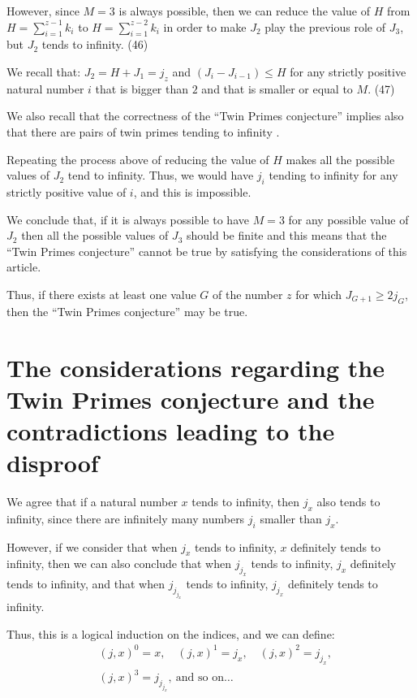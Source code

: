 \documentclass[11pt]{article}
\begin{document}
However, since $M=3$ is always possible, then we can reduce the value of $H$ from $H = \sum_{i=1}^{z-1} k_i$ to $H = \sum_{i=1}^{z-2} k_i$ in order to make $J_2$ play the previous role of $J_3$, but $J_2$ tends to infinity. \hfill (46)

We recall that: $J_2 = H+J_1 = j_z$ and $(J_i-J_{i-1}) \leq H$ for any strictly positive natural number $i$ that is bigger than $2$ and that is smaller or equal to $M$. \hfill (47)

We also recall that the correctness of the ``Twin Primes conjecture'' implies also that there are pairs of twin primes tending to infinity \cite{ref4,ref5}.

Repeating the process above of reducing the value of $H$ makes all the possible values of $J_2$ tend to infinity. Thus, we would have $j_i$ tending to infinity for any strictly positive value of $i$, and this is impossible.

We conclude that, if it is always possible to have $M=3$ for any possible value of $J_2$ then all the possible values of $J_3$ should be finite and this means that the ``Twin Primes conjecture'' cannot be true by satisfying the considerations of this article.

Thus, if there exists at least one value $G$ of the number $z$ for which $J_{G+1} \geq 2j_G$, then the ``Twin Primes conjecture'' may be true.

\section{The considerations regarding the Twin Primes conjecture and the contradictions leading to the disproof}

We agree that if a natural number $x$ tends to infinity, then $j_x$ also tends to infinity, since there are infinitely many numbers $j_i$ smaller than $j_x$.

However, if we consider that when $j_x$ tends to infinity, $x$ definitely tends to infinity, then we can also conclude that when $j_{j_x}$ tends to infinity, $j_x$ definitely tends to infinity, and that when $j_{j_{j_x}}$ tends to infinity, $j_{j_x}$ definitely tends to infinity.

Thus, this is a logical induction on the indices, and we can define:
\begin{equation}
\begin{aligned}&(j,x)^0 = x, \quad (j,x)^1 = j_x, \quad (j,x)^2 = j_{j_x},\\ &(j,x)^3 = j_{j_{j_x}}, \ \text{and so on}\ldots\end{aligned}
\end{equation}
\end{document}
